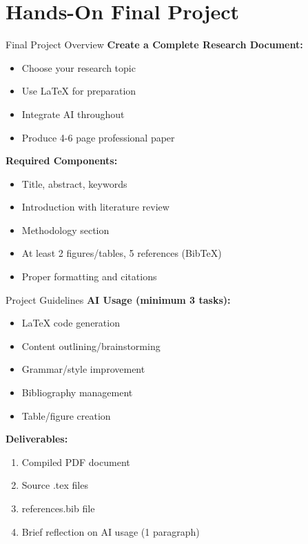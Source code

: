 \documentclass[aspectratio=169]{beamer}
\begin{document}
	\section{Hands-On Final Project}
	
	\begin{frame}{Final Project Overview}
		\textbf{Create a Complete Research Document:}
		
		\begin{itemize}
			\item Choose your research topic
			\item Use LaTeX for preparation
			\item Integrate AI throughout
			\item Produce 4-6 page professional paper
		\end{itemize}
		
		\vspace{0.5em}
		
		\textbf{Required Components:}
		\begin{itemize}
			\item Title, abstract, keywords
			\item Introduction with literature review
			\item Methodology section
			\item At least 2 figures/tables, 5 references (BibTeX)
			\item Proper formatting and citations
		\end{itemize}
	\end{frame}
	
	\begin{frame}{Project Guidelines}
		\textbf{AI Usage (minimum 3 tasks):}
		\begin{itemize}
			\item LaTeX code generation
			\item Content outlining/brainstorming
			\item Grammar/style improvement
			\item Bibliography management
			\item Table/figure creation
		\end{itemize}
		
		\vspace{0.5em}
		
		\textbf{Deliverables:}
		\begin{enumerate}
			\item Compiled PDF document
			\item Source .tex files
			\item references.bib file
			\item Brief reflection on AI usage (1 paragraph)
		\end{enumerate}
	\end{frame}
	
\end{document}

